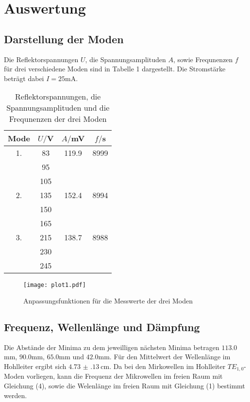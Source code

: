 \section{Auswertung}
\label{sec:Auswertung}

\subsection{Darstellung der Moden}
Die Reflektorspannungen $U$, die Spannungsamplituden $A$, sowie Frequnenzen $f$ für drei verschiedene Moden sind in Tabelle 1 dargestellt.
Die Stromstärke beträgt dabei $I = 25$mA.



\begin{table}[H]
  \centering
  \caption{Reflektorspannungen, die Spannungsamplituden und die Frequnenzen der drei Moden}
  \label{tab:Parameter}
  \begin{tabular}{c c c c}
    \toprule
    Mode & $U/$V & $A/$mV& $f/$s\\
    \midrule
    1. & 83  &   119.9& 8999 \\
       & 95  & &       \\
       & 105 & &       \\
    2. & 135 &   152.4 & 8994 \\
       & 150 & & \\
       & 165 & & \\
    3. & 215 &   138.7 & 8988 \\
       & 230 & & \\
       & 245 & & \\
    \bottomrule
  \end{tabular}
\end{table}

\begin{figure}
  \centering
  \texttt{[image: plot1.pdf]}
  \caption{Anpassungsfunktionen für die Messwerte der drei Moden}
  \label{fig:plot}
\end{figure}



\subsection{Frequenz, Wellenlänge und Dämpfung}
Die Abstände der Minima zu dem jeweilligen nächsten Minima betragen $113.0$mm, $90.0$mm,
$65.0$mm und $42.0$mm.
Für den Mittelwert der Wellenlänge im Hohlleiter ergibt sich $\SI{4.73(13)}{\centi\meter}$.
Da bei den Mirkowellen im Hohlleiter $TE_{1,0}$-Moden vorliegen, kann die Frequenz der
Mikrowellen im freien Raum mit Gleichung (4), sowie die Welenlänge im freien Raum mit Gleichung (1)
bestimmt werden.

